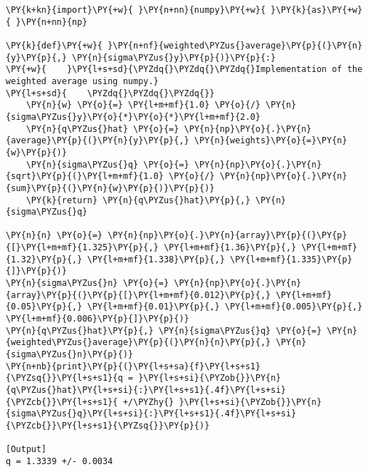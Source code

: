 \begin{Verbatim}[label=\makebox{\href{https://github.com/unipi-physics-labs/statnotes/tree/main/snippy/weighted_average.py}{https://github.com/.../weighted\_average.py}},commandchars=\\\{\}]
\PY{k+kn}{import}\PY{+w}{ }\PY{n+nn}{numpy}\PY{+w}{ }\PY{k}{as}\PY{+w}{ }\PY{n+nn}{np}

\PY{k}{def}\PY{+w}{ }\PY{n+nf}{weighted\PYZus{}average}\PY{p}{(}\PY{n}{y}\PY{p}{,} \PY{n}{sigma\PYZus{}y}\PY{p}{)}\PY{p}{:}
\PY{+w}{    }\PY{l+s+sd}{\PYZdq{}\PYZdq{}\PYZdq{}Implementation of the weighted average using numpy.}
\PY{l+s+sd}{    \PYZdq{}\PYZdq{}\PYZdq{}}
    \PY{n}{w} \PY{o}{=} \PY{l+m+mf}{1.0} \PY{o}{/} \PY{n}{sigma\PYZus{}y}\PY{o}{*}\PY{o}{*}\PY{l+m+mf}{2.0}
    \PY{n}{q\PYZus{}hat} \PY{o}{=} \PY{n}{np}\PY{o}{.}\PY{n}{average}\PY{p}{(}\PY{n}{y}\PY{p}{,} \PY{n}{weights}\PY{o}{=}\PY{n}{w}\PY{p}{)}
    \PY{n}{sigma\PYZus{}q} \PY{o}{=} \PY{n}{np}\PY{o}{.}\PY{n}{sqrt}\PY{p}{(}\PY{l+m+mf}{1.0} \PY{o}{/} \PY{n}{np}\PY{o}{.}\PY{n}{sum}\PY{p}{(}\PY{n}{w}\PY{p}{)}\PY{p}{)}
    \PY{k}{return} \PY{n}{q\PYZus{}hat}\PY{p}{,} \PY{n}{sigma\PYZus{}q}

\PY{n}{n} \PY{o}{=} \PY{n}{np}\PY{o}{.}\PY{n}{array}\PY{p}{(}\PY{p}{[}\PY{l+m+mf}{1.325}\PY{p}{,} \PY{l+m+mf}{1.36}\PY{p}{,} \PY{l+m+mf}{1.32}\PY{p}{,} \PY{l+m+mf}{1.338}\PY{p}{,} \PY{l+m+mf}{1.335}\PY{p}{]}\PY{p}{)}
\PY{n}{sigma\PYZus{}n} \PY{o}{=} \PY{n}{np}\PY{o}{.}\PY{n}{array}\PY{p}{(}\PY{p}{[}\PY{l+m+mf}{0.012}\PY{p}{,} \PY{l+m+mf}{0.05}\PY{p}{,} \PY{l+m+mf}{0.01}\PY{p}{,} \PY{l+m+mf}{0.005}\PY{p}{,} \PY{l+m+mf}{0.006}\PY{p}{]}\PY{p}{)}
\PY{n}{q\PYZus{}hat}\PY{p}{,} \PY{n}{sigma\PYZus{}q} \PY{o}{=} \PY{n}{weighted\PYZus{}average}\PY{p}{(}\PY{n}{n}\PY{p}{,} \PY{n}{sigma\PYZus{}n}\PY{p}{)}
\PY{n+nb}{print}\PY{p}{(}\PY{l+s+sa}{f}\PY{l+s+s1}{\PYZsq{}}\PY{l+s+s1}{q = }\PY{l+s+si}{\PYZob{}}\PY{n}{q\PYZus{}hat}\PY{l+s+si}{:}\PY{l+s+s1}{.4f}\PY{l+s+si}{\PYZcb{}}\PY{l+s+s1}{ +/\PYZhy{} }\PY{l+s+si}{\PYZob{}}\PY{n}{sigma\PYZus{}q}\PY{l+s+si}{:}\PY{l+s+s1}{.4f}\PY{l+s+si}{\PYZcb{}}\PY{l+s+s1}{\PYZsq{}}\PY{p}{)}

[Output]
q = 1.3339 +/- 0.0034
\end{Verbatim}
